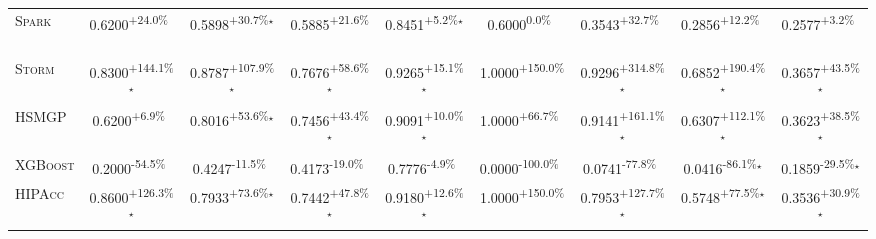 \begin{table}[htbp]
\begin{tabular}{l|cccc|cccc}
\textsc{Spark} & \cellcolor{green!30}0.6200\textsuperscript{+24.0\%}$^{\,\,\,}$ & \cellcolor{green!30}0.5898\textsuperscript{+30.7\%}$^\star$ & \cellcolor{green!30}0.5885\textsuperscript{+21.6\%}$^{\,\,\,}$ & \cellcolor{green!30}0.8451\textsuperscript{+5.2\%}$^\star$ & \cellcolor{red!30}0.6000\textsuperscript{0.0\%}$^{\,\,\,}$ & \cellcolor{green!30}0.3543\textsuperscript{+32.7\%}$^{\,\,\,}$ & \cellcolor{green!30}0.2856\textsuperscript{+12.2\%}$^{\,\,\,}$ & \cellcolor{green!30}0.2577\textsuperscript{+3.2\%}$^{\,\,\,}$ \\
\textsc{Storm} & \cellcolor{green!30}0.8300\textsuperscript{+144.1\%}$^\star$ & \cellcolor{green!30}0.8787\textsuperscript{+107.9\%}$^\star$ & \cellcolor{green!30}0.7676\textsuperscript{+58.6\%}$^\star$ & \cellcolor{green!30}0.9265\textsuperscript{+15.1\%}$^\star$ & \cellcolor{green!30}1.0000\textsuperscript{+150.0\%}$^{\,\,\,}$ & \cellcolor{green!30}0.9296\textsuperscript{+314.8\%}$^\star$ & \cellcolor{green!30}0.6852\textsuperscript{+190.4\%}$^\star$ & \cellcolor{green!30}0.3657\textsuperscript{+43.5\%}$^\star$ \\
\textsc{HSMGP} & \cellcolor{green!30}0.6200\textsuperscript{+6.9\%}$^{\,\,\,}$ & \cellcolor{green!30}0.8016\textsuperscript{+53.6\%}$^\star$ & \cellcolor{green!30}0.7456\textsuperscript{+43.4\%}$^\star$ & \cellcolor{green!30}0.9091\textsuperscript{+10.0\%}$^\star$ & \cellcolor{green!30}1.0000\textsuperscript{+66.7\%}$^{\,\,\,}$ & \cellcolor{green!30}0.9141\textsuperscript{+161.1\%}$^\star$ & \cellcolor{green!30}0.6307\textsuperscript{+112.1\%}$^\star$ & \cellcolor{green!30}0.3623\textsuperscript{+38.5\%}$^\star$ \\
\textsc{XGBoost} & \cellcolor{red!30}0.2000\textsuperscript{-54.5\%}$^{\,\,\,}$ & \cellcolor{red!30}0.4247\textsuperscript{-11.5\%}$^{\,\,\,}$ & \cellcolor{red!30}0.4173\textsuperscript{-19.0\%}$^{\,\,\,}$ & \cellcolor{red!30}0.7776\textsuperscript{-4.9\%}$^{\,\,\,}$ & \cellcolor{red!30}0.0000\textsuperscript{-100.0\%}$^{\,\,\,}$ & \cellcolor{red!30}0.0741\textsuperscript{-77.8\%}$^{\,\,\,}$ & \cellcolor{red!30}0.0416\textsuperscript{-86.1\%}$^\star$ & \cellcolor{red!30}0.1859\textsuperscript{-29.5\%}$^\star$ \\
\textsc{HIPAcc} & \cellcolor{green!30}0.8600\textsuperscript{+126.3\%}$^\star$ & \cellcolor{green!30}0.7933\textsuperscript{+73.6\%}$^\star$ & \cellcolor{green!30}0.7442\textsuperscript{+47.8\%}$^\star$ & \cellcolor{green!30}0.9180\textsuperscript{+12.6\%}$^\star$ & \cellcolor{green!30}1.0000\textsuperscript{+150.0\%}$^{\,\,\,}$ & \cellcolor{green!30}0.7953\textsuperscript{+127.7\%}$^\star$ & \cellcolor{green!30}0.5748\textsuperscript{+77.5\%}$^\star$ & \cellcolor{green!30}0.3536\textsuperscript{+30.9\%}$^\star$ \\

\end{tabular}
\end{table}
